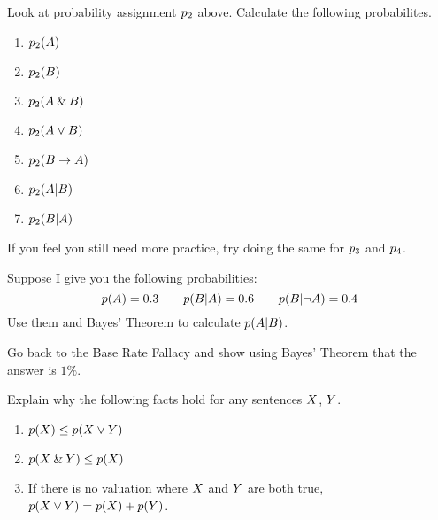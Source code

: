 \practiceproblems

\problempart Look at probability assignment $p_2$ above. Calculate the following probabilites.
\begin{enumerate}
\item $p_2(A)$
\item $p_2(B)$
\item $p_2(A\mathbin{\&}  B)$
\item $p_2(A \vee B)$
\item $p_2(B\rightarrow A)$
\item $p_2(A | B)$
\item $p_2(B | A)$
\end{enumerate}
If you feel you still need more practice, try doing the same for $p_3$ and $p_4$.



\problempart Suppose I give you the following probabilities:
\[
p(A) = 0.3 \qquad p(B | A) = 0.6 \qquad p(B | \neg A) = 0.4
\]
Use them and Bayes' Theorem to calculate $p(A | B)$.

\problempart Go back to the Base Rate Fallacy and show using Bayes' Theorem that the answer is $1\%$. 

\problempart Explain why the following facts hold for any sentences $X$, $Y$.
\begin{enumerate}
\item $p(X) \leq p(X \vee Y)$
\item $p(X\mathbin{\&} Y) \leq p(X)$
\item If there is no valuation where $X$ and $Y$ are both true, $p(X \vee Y) = p(X) + p(Y)$.
\end{enumerate}

